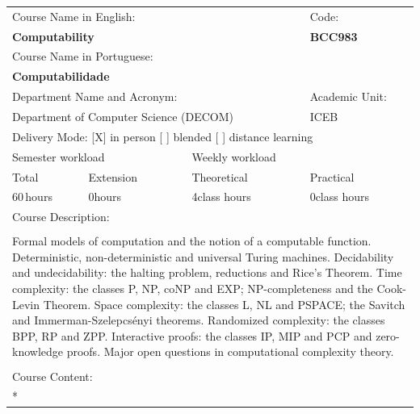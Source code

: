 \documentclass[11pt]{article}
\begin{document}
\begin{center}
\begin{longtable}{|p{4cm}|p{4cm}|p{4cm}|p{4cm}|}
\hline
\multicolumn{3}{|p{12cm}|}{Course Name in English:} &
\multicolumn{1}{p{4cm}|}{Code:} \\ 
\multicolumn{3}{|p{12cm}|}{\textbf{Computability}} &
\textbf{BCC983}\\ 
\multicolumn{3}{|p{12cm}|}{Course Name in Portuguese:} & \\ 
\multicolumn{3}{|p{12cm}|}{\textbf{Computabilidade}} & \\ 
\hline
\multicolumn{3}{|p{12cm}|}{Department Name and Acronym:} & Academic Unit: \\ 
\multicolumn{3}{|p{12cm}|}{Department of Computer Science (DECOM)} & {ICEB} \\ 
\hline
\multicolumn{4}{|p{16cm}|}{Delivery Mode:
[X] in person \hspace{0.6cm}
[ ] blended \hspace{0.6cm}
[ ] distance learning}\\
\hline
\multicolumn{2}{|p{8cm}|}{Semester workload} &
\multicolumn{2}{p{8cm}|}{Weekly workload}\\
\hline
\multicolumn{1}{|p{4cm}|}{Total} &
\multicolumn{1}{p{4cm}|}{Extension} &
\multicolumn{1}{p{4cm}|}{Theoretical} &
\multicolumn{1}{p{4cm}|}{Practical} \\ 
\multicolumn{1}{|p{4cm}|}{60\,hours} &
\multicolumn{1}{p{4cm}|}{0\;hours} &
\multicolumn{1}{p{4cm}|}{4\;class hours} &
\multicolumn{1}{p{4cm}|}{0\;class hours} \\ 
\hline
\multicolumn{4}{|p{16cm}|}{Course Description:}\\
\multicolumn{4}{|p{16cm}|}{}\\
\multicolumn{4}{|p{\dimexpr 16cm + 6\tabcolsep\relax}|}{Formal models of computation and the notion of a computable function. Deterministic, non-deterministic and universal Turing machines. Decidability and undecidability: the halting problem, reductions and Rice's Theorem. Time complexity: the classes P, NP, coNP and EXP; NP-completeness and the Cook-Levin Theorem. Space complexity: the classes L, NL and PSPACE; the Savitch and Immerman-Szelepcsényi theorems. Randomized complexity: the classes BPP, RP and ZPP. Interactive proofs: the classes IP, MIP and PCP and zero-knowledge proofs. Major open questions in computational complexity theory.}\\
\multicolumn{4}{|p{16cm}|}{}\\
\hline
\multicolumn{4}{|p{16cm}|}{Course Content:}\\*

\end{longtable}
\end{center}
\end{document}
